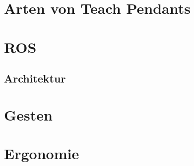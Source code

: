 
\section{Arten von Teach Pendants}

\section{ROS} %

\subsection{Architektur}

\section{Gesten}

\section{Ergonomie}
